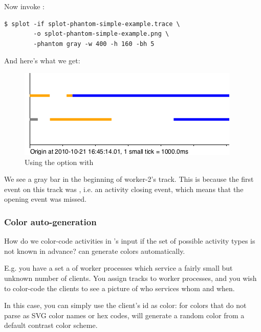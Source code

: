 \documentclass{article}
\begin{document}
Now invoke \splot{}:
\begin{verbatim}
$ splot -if splot-phantom-simple-example.trace \
        -o splot-phantom-simple-example.png \
        -phantom gray -w 400 -h 160 -bh 5 
\end{verbatim}

And here's what we get:

\begin{figure}[h!]
\center
\includegraphics[scale=0.5]{pics/splot/splot-phantom-simple-example.png}
\caption{Using the  option with \splot{}}
\end{figure}

We see a gray bar in the beginning of worker-2's track. This is because the first event on this track was , i.e. an activity closing event, which means that the opening event was missed.

\subsubsection{Color auto-generation}

How do we color-code activities in \splot{}'s input if the set of possible activity types is not known in advance? \splot{} can generate colors automatically.

E.g. you have a set a of worker processes which service a fairly small but unknown number of clients. You assign tracks to worker processes, and you wish to color-code the clients to see a picture of who services whom and when.

In this case, you can simply use the client's id as color: for colors that do not parse as SVG color names or hex codes, \splot{} will generate a random color from a default contrast color scheme.
\end{document}
